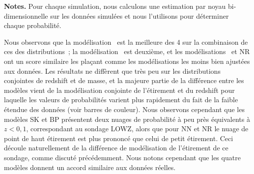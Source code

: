 \documentclass[../main/main.tex]{subfiles}
\begin{document}
\begin{table}[ht]
    \centering
     \caption[Comparaison de la capacité de chaque simulation à représenter
        les données en deux dimensions]{Comparaison de la capacité de chaque
            simulation à représenter les données d'étirement et de masse d'une
        part, et d'étirement et de redshift d'autre part.}
    \label{tab:chi2comp}
    \begin{threeparttable}
    \begin{tablenotes}[flushleft]
        \item \small \textbf{\hspace{-3,2pt}Notes.} Pour chaque simulation, nous
            calculons une estimation par noyau bi-dimensionnelle sur les données
            simulées et nous l'utilisons pour déterminer chaque probabilité.
    \end{tablenotes}
    \end{threeparttable}
\end{table}

Nous observons que la modélisation~ est la meilleure des
4 sur la combinaison de ces des distributions~; la
modélisation~ est deuxième, et les
modélisations~ et NR ont un score similaire les plaçant
comme les modélisations les moins bien ajustées aux données. Les résultats ne
diffèrent que très peu sur les distributions conjointes de redshift et de masse,
et la majeure partie de la différence entre les modèles vient de la modélisation
conjointe de l'étirement et du redshift pour laquelle les valeurs de
probabilités varient plus rapidement du fait de la faible étendue des données
(voir barres de couleur). Nous observons cependant que les modèles SK et BP
présentent deux nuages de probabilité à peu près équivalents à $z < 0,1$,
correspondant au sondage LOWZ, alors que pour NN et NR le nuage de point de haut
étirement est plus prononcé que celui de petit étirement. Ceci découle
naturellement de la différence de modélisation de l'étirement de ce sondage,
comme discuté précédemment. Nous notons cependant que les quatre modèles donnent
un accord similaire aux données réelles.
\end{document}
